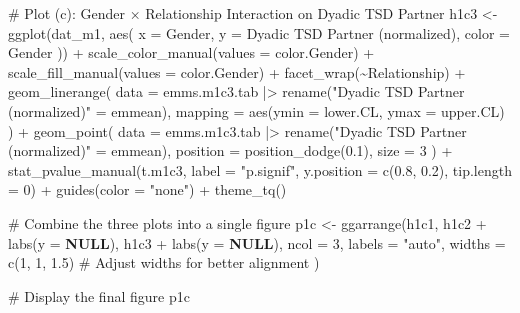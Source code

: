 \documentclass[
  bookmarksnumbered]{article}
\newenvironment{Shaded}{\begin{snugshade}}{\end{snugshade}}
\newcommand{\AttributeTok}[1]{\textcolor[rgb]{0.80,0.80,0.80}{#1}}
\newcommand{\CommentTok}[1]{\textcolor[rgb]{0.50,0.62,0.50}{#1}}
\newcommand{\ConstantTok}[1]{\textcolor[rgb]{0.86,0.64,0.64}{\textbf{#1}}}
\newcommand{\DecValTok}[1]{\textcolor[rgb]{0.86,0.86,0.80}{#1}}
\newcommand{\FloatTok}[1]{\textcolor[rgb]{0.75,0.75,0.82}{#1}}
\newcommand{\FunctionTok}[1]{\textcolor[rgb]{0.94,0.94,0.56}{#1}}
\newcommand{\NormalTok}[1]{\textcolor[rgb]{0.80,0.80,0.80}{#1}}
\newcommand{\OtherTok}[1]{\textcolor[rgb]{0.94,0.94,0.56}{#1}}
\newcommand{\SpecialCharTok}[1]{\textcolor[rgb]{0.86,0.64,0.64}{#1}}
\newcommand{\StringTok}[1]{\textcolor[rgb]{0.80,0.58,0.58}{#1}}
\begin{document}
\begin{Shaded}
\begin{Highlighting}[]
\CommentTok{\# Plot (c): Gender × Relationship Interaction on Dyadic TSD Partner}
\NormalTok{h1c3 }\OtherTok{\textless{}{-}} \FunctionTok{ggplot}\NormalTok{(dat\_m1, }\FunctionTok{aes}\NormalTok{(}
  \AttributeTok{x =}\NormalTok{ Gender, }\AttributeTok{y =} \StringTok{\textasciigrave{}}\AttributeTok{Dyadic TSD Partner (normalized)}\StringTok{\textasciigrave{}}\NormalTok{, }\AttributeTok{color =}\NormalTok{ Gender}
\NormalTok{)) }\SpecialCharTok{+}
  \FunctionTok{scale\_color\_manual}\NormalTok{(}\AttributeTok{values =}\NormalTok{ color.Gender) }\SpecialCharTok{+}
  \FunctionTok{scale\_fill\_manual}\NormalTok{(}\AttributeTok{values =}\NormalTok{ color.Gender) }\SpecialCharTok{+}
  \FunctionTok{facet\_wrap}\NormalTok{(}\SpecialCharTok{\textasciitilde{}}\NormalTok{Relationship) }\SpecialCharTok{+}
  \FunctionTok{geom\_linerange}\NormalTok{(}
    \AttributeTok{data =}\NormalTok{ emms.m1c3.tab }\SpecialCharTok{|\textgreater{}} \FunctionTok{rename}\NormalTok{(}\StringTok{"Dyadic TSD Partner (normalized)"} \OtherTok{=}\NormalTok{ emmean),}
    \AttributeTok{mapping =} \FunctionTok{aes}\NormalTok{(}\AttributeTok{ymin =}\NormalTok{ lower.CL, }\AttributeTok{ymax =}\NormalTok{ upper.CL)}
\NormalTok{  ) }\SpecialCharTok{+}
  \FunctionTok{geom\_point}\NormalTok{(}
    \AttributeTok{data =}\NormalTok{ emms.m1c3.tab }\SpecialCharTok{|\textgreater{}} \FunctionTok{rename}\NormalTok{(}\StringTok{"Dyadic TSD Partner (normalized)"} \OtherTok{=}\NormalTok{ emmean),}
    \AttributeTok{position =} \FunctionTok{position\_dodge}\NormalTok{(}\FloatTok{0.1}\NormalTok{), }\AttributeTok{size =} \DecValTok{3}
\NormalTok{  ) }\SpecialCharTok{+}
  \FunctionTok{stat\_pvalue\_manual}\NormalTok{(t.m1c3, }\AttributeTok{label =} \StringTok{"p.signif"}\NormalTok{, }\AttributeTok{y.position =} \FunctionTok{c}\NormalTok{(}\FloatTok{0.8}\NormalTok{, }\FloatTok{0.2}\NormalTok{), }\AttributeTok{tip.length =} \DecValTok{0}\NormalTok{) }\SpecialCharTok{+}
  \FunctionTok{guides}\NormalTok{(}\AttributeTok{color =} \StringTok{"none"}\NormalTok{) }\SpecialCharTok{+}
  \FunctionTok{theme\_tq}\NormalTok{()}

\CommentTok{\# Combine the three plots into a single figure}
\NormalTok{p1c }\OtherTok{\textless{}{-}} \FunctionTok{ggarrange}\NormalTok{(h1c1, h1c2 }\SpecialCharTok{+} \FunctionTok{labs}\NormalTok{(}\AttributeTok{y =} \ConstantTok{NULL}\NormalTok{), h1c3 }\SpecialCharTok{+} \FunctionTok{labs}\NormalTok{(}\AttributeTok{y =} \ConstantTok{NULL}\NormalTok{),}
  \AttributeTok{ncol =} \DecValTok{3}\NormalTok{, }\AttributeTok{labels =} \StringTok{"auto"}\NormalTok{, }\AttributeTok{widths =} \FunctionTok{c}\NormalTok{(}\DecValTok{1}\NormalTok{, }\DecValTok{1}\NormalTok{, }\FloatTok{1.5}\NormalTok{) }\CommentTok{\# Adjust widths for better alignment}
\NormalTok{)}

\CommentTok{\# Display the final figure}
\NormalTok{p1c}
\end{Highlighting}
\end{Shaded}
\end{document}
